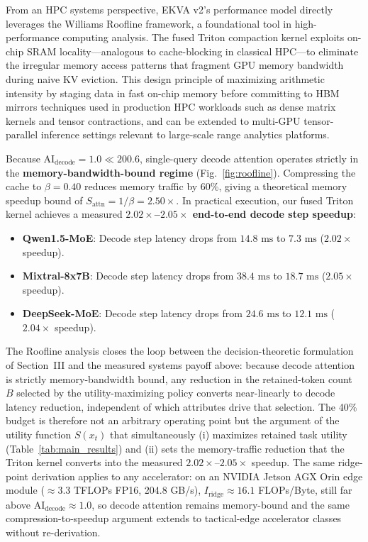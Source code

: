\documentclass[conference]{IEEEtran}
\begin{document}
From an HPC systems perspective, EKVA v2's performance model directly leverages the Williams Roofline framework, a foundational tool in high-performance computing analysis. The fused Triton compaction kernel exploits on-chip SRAM locality---analogous to cache-blocking in classical HPC---to eliminate the irregular memory access patterns that fragment GPU memory bandwidth during naive KV eviction. This design principle of maximizing arithmetic intensity by staging data in fast on-chip memory before committing to HBM mirrors techniques used in production HPC workloads such as dense matrix kernels and tensor contractions, and can be extended to multi-GPU tensor-parallel inference settings relevant to large-scale range analytics platforms.

Because $\text{AI}_{\text{decode}} = 1.0 \ll 200.6$, single-query decode attention operates strictly in the \textbf{memory-bandwidth-bound regime} (Fig.~\ref{fig:roofline}). Compressing the cache to $\beta = 0.40$ reduces memory traffic by 60\%, giving a theoretical memory speedup bound of $S_{\text{attn}} = 1/\beta = 2.50\times$. In practical execution, our fused Triton kernel achieves a measured \textbf{$2.02\times$--$2.05\times$ end-to-end decode step speedup}:
\begin{itemize}
    \item \textbf{Qwen1.5-MoE}: Decode step latency drops from $14.8\text{ ms}$ to $7.3\text{ ms}$ ($2.02\times$ speedup).
    \item \textbf{Mixtral-8x7B}: Decode step latency drops from $38.4\text{ ms}$ to $18.7\text{ ms}$ ($2.05\times$ speedup).
    \item \textbf{DeepSeek-MoE}: Decode step latency drops from $24.6\text{ ms}$ to $12.1\text{ ms}$ ($2.04\times$ speedup).
\end{itemize}

The Roofline analysis closes the loop between the decision-theoretic formulation of Section~III and the measured systems payoff above: because decode attention is strictly memory-bandwidth bound, any reduction in the retained-token count $B$ selected by the utility-maximizing policy converts near-linearly to decode latency reduction, independent of which attributes drive that selection. The 40\% budget is therefore not an arbitrary operating point but the argument of the utility function $S(x_t)$ that simultaneously (i) maximizes retained task utility (Table~\ref{tab:main_results}) and (ii) sets the memory-traffic reduction that the Triton kernel converts into the measured $2.02\times$--$2.05\times$ speedup. The same ridge-point derivation applies to any accelerator: on an NVIDIA Jetson AGX Orin edge module ($\approx 3.3$ TFLOPs FP16, 204.8 GB/s), $I_{\text{ridge}} \approx 16.1$ FLOPs/Byte, still far above $\text{AI}_{\text{decode}} \approx 1.0$, so decode attention remains memory-bound and the same compression-to-speedup argument extends to tactical-edge accelerator classes without re-derivation.
\end{document}

